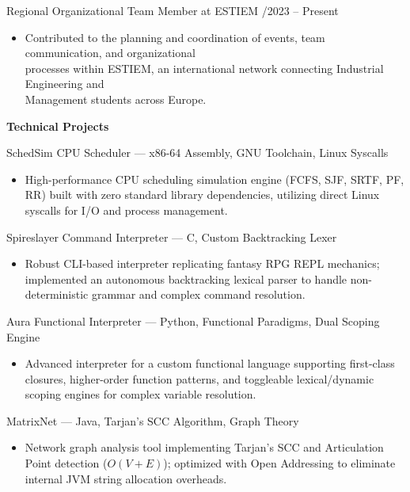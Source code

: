 \documentclass[a4paper]{article}
\newcommand{\sechead}[1]{
    \vspace{10pt}
    {\fontsize{12}{14}\bfseries #1} \par
    \vspace{4pt}
}
\newcommand{\entry}[2]{
    {\fontsize{10}{12}\fontseries{sb}\selectfont #1} \hfill {\fontsize{8}{10}\selectfont #2} \par
}
\newcommand{\desc}[1]{
    {\fontsize{8}{11}\selectfont #1}
}
\begin{document}
\entry{Regional Organizational Team Member at ESTIEM}{09/2023 -- Present}
\begin{itemize}[leftmargin=1.1em, itemsep=0pt, parsep=0pt, topsep=2pt]
   \item \desc{Contributed to the planning and coordination of events, team communication, and organizational\\ processes within ESTIEM, an international network connecting Industrial Engineering and\\ Management students across Europe.}
\end{itemize}

\sechead{Technical Projects}

\entry{SchedSim CPU Scheduler --- \textmd{x86-64 Assembly, GNU Toolchain, Linux Syscalls}}{}
\begin{itemize}[leftmargin=1.1em, itemsep=0pt, parsep=0pt, topsep=1pt]
   \item \desc{High-performance CPU scheduling simulation engine (FCFS, SJF, SRTF, PF, RR) built with zero standard library dependencies, utilizing direct Linux syscalls for I/O and process management.}
\end{itemize}
\vspace{2pt}

\entry{Spireslayer Command Interpreter --- \textmd{C, Custom Backtracking Lexer}}{}
\begin{itemize}[leftmargin=1.1em, itemsep=0pt, parsep=0pt, topsep=1pt]
   \item \desc{Robust CLI-based interpreter replicating fantasy RPG REPL mechanics; implemented an autonomous backtracking lexical parser to handle non-deterministic grammar and complex command resolution.}
\end{itemize}
\vspace{2pt}
\entry{Aura Functional Interpreter --- \textmd{Python, Functional Paradigms, Dual Scoping Engine}}{}
\begin{itemize}[leftmargin=1.1em, itemsep=0pt, parsep=0pt, topsep=1pt]
   \item \desc{Advanced interpreter for a custom functional language supporting first-class closures, higher-order function patterns, and toggleable lexical/dynamic scoping engines for complex variable resolution.}
\end{itemize}
\vspace{2pt}

\entry{MatrixNet --- \textmd{Java, Tarjan's SCC Algorithm, Graph Theory}}{}
\begin{itemize}[leftmargin=1.1em, itemsep=0pt, parsep=0pt, topsep=1pt]
   \item \desc{Network graph analysis tool implementing Tarjan's SCC and Articulation Point detection ($O(V+E)$); optimized with Open Addressing to eliminate internal JVM string allocation overheads.}
\end{itemize}
\vspace{2pt}
\end{document}
